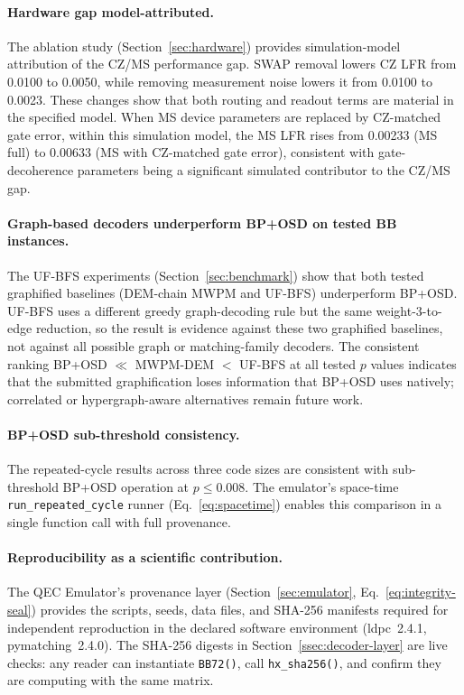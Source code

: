 \documentclass[11pt,a4paper]{article}
\begin{document}
\paragraph{Hardware gap model-attributed.}
The ablation study (Section~\ref{sec:hardware}) provides simulation-model attribution of the CZ/MS performance gap.
SWAP removal lowers CZ LFR from 0.0100 to 0.0050, while removing measurement noise lowers it from 0.0100 to 0.0023.
These changes show that both routing and readout terms are material in the specified model.
When MS device parameters are replaced by CZ-matched gate error,
within this simulation model, the MS LFR rises from 0.00233 (MS full) to 0.00633
(MS with CZ-matched gate error), consistent with gate-decoherence parameters
being a significant simulated contributor to the CZ/MS gap.

\paragraph{Graph-based decoders underperform BP+OSD on tested BB instances.}
The UF-BFS experiments (Section~\ref{sec:benchmark}) show that both tested graphified baselines (DEM-chain MWPM and UF-BFS) underperform BP+OSD.
UF-BFS uses a different greedy graph-decoding rule but the same weight-3-to-edge reduction, so the result is evidence against these two graphified baselines, not against all possible graph or matching-family decoders.
The consistent ranking BP+OSD $\ll$ MWPM-DEM $<$ UF-BFS at all tested $p$ values indicates that the submitted graphification loses information that BP+OSD uses natively; correlated or hypergraph-aware alternatives remain future work.

\paragraph{BP+OSD sub-threshold consistency.}
The repeated-cycle results across three code sizes are consistent with
sub-threshold BP+OSD operation at $p\le0.008$.
The emulator's space-time \texttt{run\_repeated\_cycle} runner
(Eq.~\ref{eq:spacetime}) enables this comparison in a single function call
with full provenance.

\paragraph{Reproducibility as a scientific contribution.}
The QEC Emulator's provenance layer (Section~\ref{sec:emulator},
Eq.~\ref{eq:integrity-seal}) provides the scripts, seeds, data files, and SHA-256 manifests required for
independent reproduction in the declared software environment (ldpc~2.4.1, pymatching~2.4.0).
The SHA-256 digests in Section~\ref{ssec:decoder-layer} are live checks:
any reader can instantiate \texttt{BB72()}, call \texttt{hx\_sha256()},
and confirm they are computing with the same matrix.
\end{document}
